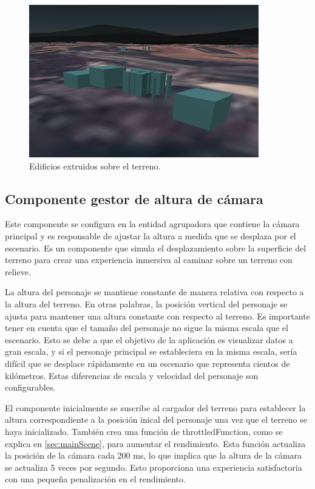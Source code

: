 \documentclass[a4paper, 11pt]{book}
\begin{document}
\begin{figure}[h]
  \centering
  \includegraphics[width=10cm, keepaspectratio]{img/buildings.jpg}
  \caption{Edificios extruidos sobre el terreno.}
  \label{fig:buildings}
\end{figure}
\subsection{Componente gestor de altura de cámara}
\label{subsec:cameraHeight}
Este componente se configura en la entidad agrupadora que contiene la cámara principal y es responsable de ajustar la altura a medida que se desplaza por el escenario. Es un componente que simula el desplazamiento sobre la superficie del terreno para crear una experiencia inmersiva al caminar sobre un terreno con relieve.

La altura del personaje se mantiene constante de manera relativa con respecto a la altura del terreno. En otras palabras, la posición vertical del personaje se ajusta para mantener una altura constante con respecto al terreno.
Es importante tener en cuenta que el tamaño del personaje no sigue la misma escala que el escenario. Esto se debe a que el objetivo de la aplicación es visualizar datos a gran escala, y si el personaje principal se estableciera en la misma escala, sería difícil que se desplace rápidamente en un escenario que representa cientos de kilómetros. Estas diferencias de escala y velocidad del personaje son configurables.

El componente inicialmente se suscribe al cargador del terreno para establecer la altura correspondiente a la posición inical del personaje una vez que el terreno se haya inicializado. También crea una función de throttledFunction, como se explica en \ref{sec:mainScene}, para aumentar el rendimiento. Esta función actualiza la posición de la cámara cada 200 ms, lo que implica que la altura de la cámara se actualiza 5 veces por segundo. Esto proporciona una experiencia satisfactoria con una pequeña penalización en el rendimiento.
\end{document}
